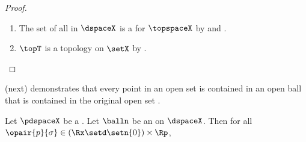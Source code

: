 \begin{proof}
\begin{enumerate}
  \item The set of all  in $\dspaceX$ is a  for $\topspaceX$ by 
         and .
        
  \item $\topT$ is a topology on $\setX$ by .
\end{enumerate}
\end{proof}

 (next) demonstrates that every point in an open set is contained in an open ball that is 
contained in the original open set .
\begin{lemma}
\label{lem:tri_open}
Let $\pdspaceX$ be a .
Let $\balln$ be an  on $\dspaceX$.
Then for all $\opair{p}{\sigma}\in(\Rx\setd\setn{0})\times\Rp$,
\\
\end{lemma}
